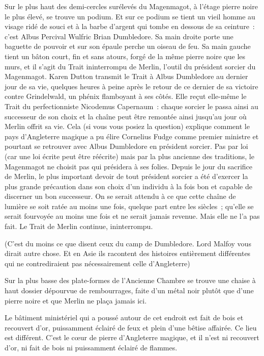 Sur le plus haut des demi-cercles surélevés du Magenmagot, à l'étage pierre noire le plus élevé, se trouve un podium.
Et sur ce podium se tient un vieil homme au visage ridé de souci et à la barbe d'argent qui tombe en dessous de sa ceinture~: c'est Albus Percival Wulfric Brian Dumbledore.
Sa main droite porte une baguette de pouvoir et sur son épaule perche un oiseau de feu.
Sa main gauche tient un bâton court, fin et sans atours, forgé de la même pierre noire que les murs, et il s'agit du Trait ininterrompu de Merlin, l'outil du président sorcier du Magenmagot.
Karen Dutton transmit le Trait à Albus Dumbledore au dernier jour de sa vie, quelques heures à peine après le retour de ce dernier de sa victoire contre Grindelwald, un phénix flamboyant à ses côtés.
Elle reçut elle-même le Trait du perfectionniste Nicodemus Capernaum~: chaque sorcier le passa ainsi au successeur de son choix et la chaîne peut être remontée ainsi jusqu'au jour où Merlin offrit sa vie.
Cela (si vous vous posiez la question) explique comment le pays d'Angleterre magique a pu élire Cornelius Fudge comme premier ministre et pourtant se retrouver avec Albus Dumbledore en président sorcier.
Pas par loi (car une loi écrite peut être réécrite) mais par la plus ancienne des traditions, le Magenmagot ne choisit pas qui présidera à ses folies.
Depuis le jour du sacrifice de Merlin, le plus important devoir de tout président sorcier a été d'exercer la plus grande précaution dans son choix d'un individu à la fois bon et capable de discerner un bon successeur.
On se serait attendu à ce que cette chaîne de lumière se soit ratée au moins une fois, quelque part entre les siècles~; qu'elle se serait fourvoyée au moins une fois et ne serait jamais revenue.
Mais elle ne l'a pas fait.
Le Trait de Merlin continue, ininterrompu.

(C'est du moins ce que disent ceux du camp de Dumbledore.
Lord Malfoy vous dirait autre chose.
Et en Asie ils racontent des histoires entièrement différentes qui ne contrediraient pas nécessairement celle d'Angleterre)

Sur la plus basse des plate-formes de l'Ancienne Chambre se trouve une chaise à haut dossier dépourvue de rembourrages, faite d'un métal noir plutôt que d'une pierre noire et que Merlin ne plaça jamais ici.

Le bâtiment ministériel qui a poussé autour de cet endroit est fait de bois et recouvert d'or, puissamment éclairé de feux et plein d'une bêtise affairée.
Ce lieu est différent.
C'est le cœur de pierre d'Angleterre magique, et il n'est ni recouvert d'or, ni fait de bois ni puissamment éclairé de flammes.

